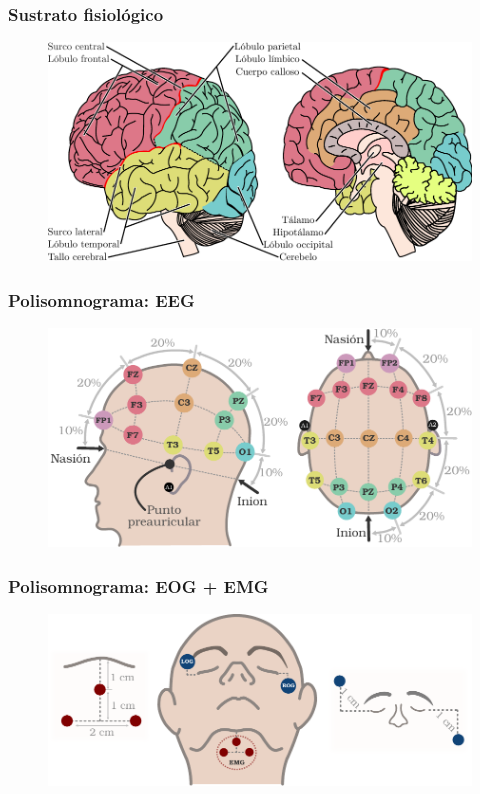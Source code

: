 \documentclass[serif,mathserif,professionalfont]{beamer}
\begin{document}
\begin{frame}\frametitle{Sustrato fisiológico}
\begin{figure}
\centering
\includegraphics[width=0.9\linewidth]{./img_diagramas/cerebro_zonas_limpio.pdf} 
\end{figure}
\end{frame}

\begin{frame}\frametitle{Polisomnograma: EEG}
\begin{figure}
\centering
\includegraphics[width=0.9\linewidth]{./img_diagramas/cabeza_proporcionada_color_v4.pdf} 
\end{figure}
\end{frame}

\begin{frame}\frametitle{Polisomnograma: EOG + EMG}
\begin{figure}
\centering
\includegraphics[width=0.9\linewidth]{./img_diagramas/emg_eog_v4.pdf} 
\end{figure}
\end{frame}
\end{document}
